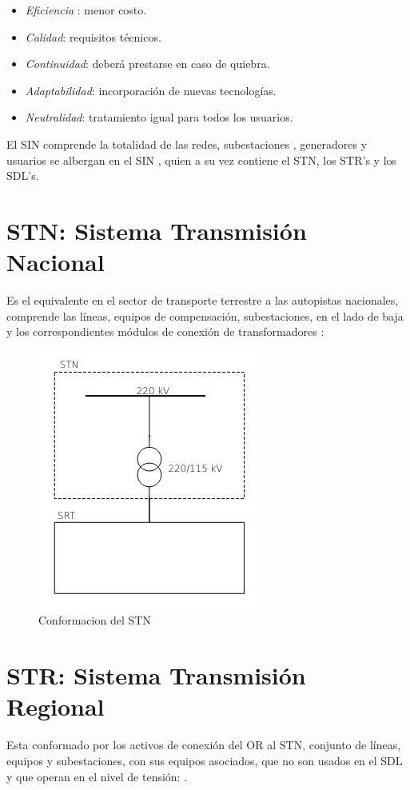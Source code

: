 \documentclass[a5paper]{book}%
\begin{document}
\begin{itemize}
\item\textit{ Eficiencia }: menor costo.
\item \textit{Calidad}: requisitos técnicos.
\item \textit{Continuidad}: deberá prestarse en caso de quiebra.
\item \textit{Adaptabilidad}: incorporación de nuevas tecnologías.
\item \textit{Neutralidad}: tratamiento igual para todos los usuarios.
\end{itemize}

El \ac{SIN} comprende la totalidad de las redes, subestaciones , generadores y usuarios se albergan en el \ac{SIN} , quien a su vez contiene el \ac{STN}, los  \ac{STR}'s y  los \ac{SDL}'s.

\section{STN: Sistema Transmisión Nacional}
Es el equivalente en el sector de transporte terrestre  a las autopistas nacionales, comprende las líneas, equipos de compensación, subestaciones, en el lado de baja y los correspondientes módulos de conexión de transformadores \cite{XM-2018-1}:
\begin{center}
\end{center}

\begin{figure}[H]
  \centering
  \caption{Conformacion del STN}
  \includegraphics[width=0.5\linewidth]{STN_F}
\end{figure}

\section{STR: Sistema Transmisión Regional}
Esta conformado por los activos de conexión del \ac{OR} al \ac{STN}, conjunto de líneas, equipos y
subestaciones, con sus equipos asociados,  que no son usados en el \ac{SDL} y que operan en el nivel de tensión:
\cite{XM-2018-1}.
\end{document}
